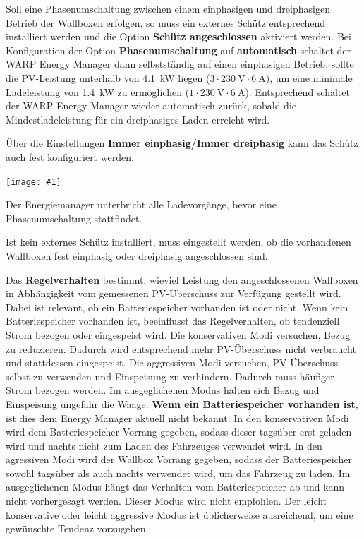 \documentclass[a4paper,10pt]{article}
\newcommand{\gfx}[1]{\texttt{[image: \#1]}}
\begin{document}
\begin{multicols*}{2}
	Soll eine Phasenumschaltung zwischen einem einphasigen und dreiphasigen Betrieb
	der Wallboxen erfolgen, so muss ein externes Schütz entsprechend installiert
	werden und die Option \textbf{Schütz angeschlossen} aktiviert werden. Bei
	Konfiguration der Option \textbf{Phasenumschaltung} auf \textbf{automatisch}
	schaltet der WARP Energy Manager dann selbstständig auf einen einphasigen
	Betrieb, sollte die PV-Leistung unterhalb von \SI{4,1}{\kilo\watt} liegen ($3\cdot\SI{230}{\volt}\cdot\SI{6}{\ampere}$), um
	eine minimale Ladeleistung von \SI{1,4}{\kilo\watt} zu ermöglichen ($1\cdot\SI{230}{\volt}\cdot\SI{6}{\ampere}$).
	Entsprechend schaltet der WARP Energy Manager wieder automatisch zurück,
	sobald die Mindestladeleistung für ein dreiphasiges Laden erreicht wird.

	Über die Einstellungen \textbf{Immer einphasig/Immer dreiphasig} kann das
	Schütz auch fest konfiguriert werden.

	\gfx{./img/resized/web_em_settings}

	Der Energiemanager unterbricht alle Ladevorgänge, bevor eine
	Phasenumschaltung stattfindet.

	Ist kein externes Schütz installiert, muss eingestellt werden, ob die
	vorhandenen Wallboxen fest einphasig oder dreiphasig angeschlossen sind.

	Das \textbf{Regelverhalten} bestimmt, wieviel Leistung den an­ge­schlos­senen Wallboxen in Abhängigkeit vom ge­messen­en PV-Über­schuss zur Verfügung gestellt wird. Dabei ist relevant, ob ein Batteriespeicher vorhanden ist oder nicht. Wenn kein Batteriespeicher vorhanden ist, beeinflusst das Regelverhalten, ob tendenziell Strom bezogen oder eingespeist wird. Die konservativen Modi versuchen, Bezug zu reduzieren. Dadurch wird entsprechend mehr PV-Über­schuss nicht verbraucht und stattdessen eingespeist. Die aggressiven Modi versuchen, PV-Über­schuss selbst zu verwenden und Einspeisung zu verhindern. Dadurch muss häufiger Strom bezogen werden. Im ausgeglichenen Modus halten sich Bezug und Einspeisung ungefähr die Waage. \textbf{Wenn ein Batteriespeicher vorhanden ist}, ist dies dem Energy Manager aktuell nicht bekannt. In den konservativen Modi wird dem Batteriespeicher Vorrang gegeben, sodass dieser tagsüber erst geladen wird und nachts nicht zum Laden des Fahr­zeuges verwendet wird. In den agressiven Modi wird der Wallbox Vorrang gegeben, sodass der Batteriespeicher sowohl tagsüber als auch nachts verwendet wird, um das Fahrzeug zu laden. Im ausgeglichenen Modus hängt das Verhalten vom Batteriespeicher ab und kann nicht vorhergesagt werden. Dieser Modus wird nicht empfohlen. Der leicht konservative oder leicht aggressive Modus ist üb­licher­weise aus­reich­end, um eine gewünschte Tendenz vorzugeben.


\end{multicols*}
\end{document}
